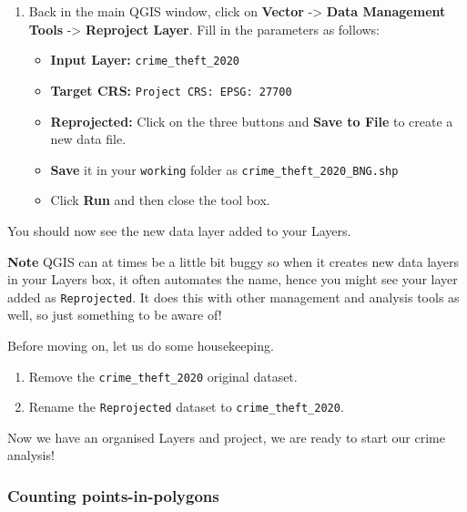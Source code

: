 \documentclass[
]{book}
\providecommand{\tightlist}{%
  \setlength{\itemsep}{0pt}\setlength{\parskip}{0pt}}
\begin{document}
\begin{enumerate}
\def\labelenumi{\arabic{enumi}.}
\setcounter{enumi}{4}
\tightlist
\item
  Back in the main QGIS window, click on \textbf{Vector} -\textgreater{} \textbf{Data Management Tools} -\textgreater{} \textbf{Reproject Layer}. Fill in the parameters as follows:

  \begin{itemize}
  \tightlist
  \item
    \textbf{Input Layer:} \texttt{crime\_theft\_2020}
  \item
    \textbf{Target CRS:} \texttt{Project\ CRS:\ EPSG:\ 27700}
  \item
    \textbf{Reprojected:} Click on the three buttons and \textbf{Save to File} to create a new data file.
  \item
    \textbf{Save} it in your \texttt{working} folder as \texttt{crime\_theft\_2020\_BNG.shp}
  \item
    Click \textbf{Run} and then close the tool box.
  \end{itemize}
\end{enumerate}

You should now see the new data layer added to your Layers.

\textbf{Note}
QGIS can at times be a little bit buggy so when it creates new data layers in your Layers box, it often automates the name, hence you might see your layer added as \texttt{Reprojected}. It does this with other management and analysis tools as well, so just something to be aware of!

Before moving on, let us do some housekeeping.

\begin{enumerate}
\def\labelenumi{\arabic{enumi}.}
\setcounter{enumi}{5}
\item
  Remove the \texttt{crime\_theft\_2020} original dataset.
\item
  Rename the \texttt{Reprojected} dataset to \texttt{crime\_theft\_2020}.
\end{enumerate}

Now we have an organised Layers and project, we are ready to start our crime analysis!

\hypertarget{counting-points-in-polygons}{%
\subsubsection{Counting points-in-polygons}\label{counting-points-in-polygons}}
\end{document}
